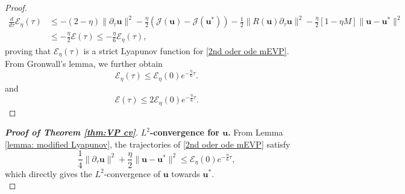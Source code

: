 \documentclass[11pt]{article}
\newcommand{\bu}{\mathbf{u}}
\begin{document}
\begin{proof}
$$\begin{aligned}
    \frac{d}{d\tau}\mathcal{E}_\eta(\tau)  &\leq -(2-\eta) \|\partial_\tau \bu\|^2 - \frac{\eta}{2} (\mathcal{J}(\bu) - \mathcal{J}(\bu^*) ) -\frac{1 }{2 }\|R(\bu)\partial_\tau \bu\|^2 - \frac{\eta}{2} \left[ 1-\eta M  \right]\|\bu-\bu^*\|^2\\
    & \leq -\frac{\eta}{2} \mathcal{E}(\tau) \leq -\frac{\eta}{6} \mathcal{E}_\eta(\tau),
\end{aligned}$$ 
proving that $\mathcal{E}_\eta(\tau)$ is a strict Lyapunov function for \eqref{2nd oder ode mEVP}. 
From Gronwall's lemma, we further obtain 
$$
\mathcal{E}_\eta(\tau)
\leq \mathcal{E}_\eta(0)e^{-\frac{\eta}{6}\tau}.
$$ and
$$
\mathcal{E}(\tau)
\leq 2 \mathcal{E}_\eta(0)e^{-\frac{\eta}{6}\tau}.
    $$
\end{proof}

\begin{proof}[\textbf{Proof of Theorem \ref{thm:VP cv}}]

\noindent  \textbf{$L^2$-convergence for $\bu$.} From Lemma \ref{lemma: modified Lyapunov}, the trajectories of \eqref{2nd oder ode mEVP} satisfy
$$\frac{1}{4} \|\partial_\tau\bu\|^2 + \frac{\eta}{2}  \|\bu-\bu^*\|^2 \leq \mathcal{E}_\eta (0)e^{-\frac{\eta}{6} \tau},
$$which directly gives the $L^2$-convergence of $\bu$ towards $\bu^*$.\\


\end{proof}
\end{document}
